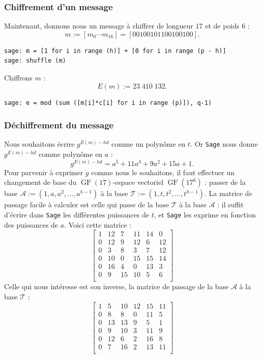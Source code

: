 \documentclass[a4paper, titlepage, 11pt]{article}
\theoremstyle{definition}
\theoremstyle{remark}
\def\gf{\operatorname{GF}}
\begin{document}
\subsubsection*{Chiffrement d'un message}
Maintenant, donnons nous un message à chiffrer de longueur $17$ et de poids $6$ :
$$m := [m_0\cdots m_{16}] = [00100101100100100].$$
\begin{verbatim}
sage: m = [1 for i in range (h)] + [0 for i in range (p - h)]
sage: shuffle (m)
\end{verbatim}
Chiffrons $m$ :
$$E(m) := 23\;410\;132.$$
\begin{verbatim}
sage: e = mod (sum ([m[i]*c[i] for i in range (p)]), q-1)
\end{verbatim}

\subsubsection*{Déchiffrement du message}
Nous souhaitons écrire $g^{E(m) - hd}$ comme un polynôme en $t$. Or \verb|Sage| nous donne $g^{E(m) - hd}$ comme polynôme en $a$ : $$g^{E(m) - hd} = a^5 + 11a^3 + 9a^2 + 15a + 1.$$
Pour parvenir à exprimer $g$ comme nous le souhaitons, il faut effectuer un changement de base du $\gf(17)$-espace vectoriel $\gf(17^6)$ : passer de la base $\mathcal{A} := (1, a, a^2, \dots, a^{h-1})$ à la base $\mathcal{T} := (1, t, t^2, \dots, t^{h-1})$.
La matrice de passage facile à calculer est celle qui passe de la base $\mathcal{T}$ à la base $\mathcal{A}$ : il suffit d'écrire dans \verb|Sage| les différentes puissances de $t$, et \verb|Sage| les exprime en fonction des puissances de $a$. Voici cette matrice :
$$\left[\begin{array}{cccccc}
1 & 12 & 7 & 11 & 14 & 0 \\
0 & 12 & 9 & 12 & 6 & 12 \\
0 & 3 & 8 & 3 & 7 & 12 \\
0 & 10 & 0 & 15 & 15 & 14 \\
0 & 16 & 4 & 0 & 13 & 3 \\
0 & 9 & 15 & 10 & 5 & 6 \\
\end{array}\right]$$
Celle qui nous intéresse est son inverse, la matrice de passage de la base $\mathcal{A}$ à la base $\mathcal{T}$ :
$$\left[\begin{array}{cccccc}
1 & 5 & 10 & 12 & 15 & 11 \\
0 & 8 & 8 & 0 & 11 & 5 \\
0 & 13 & 13 & 9 & 5 & 1 \\
0 & 9 & 10 & 3 & 11 & 9 \\
0 & 12 & 6 & 2 & 16 & 8 \\
0 & 7 & 16 & 2 & 13 & 11 \\
\end{array}\right]$$
\end{document}

